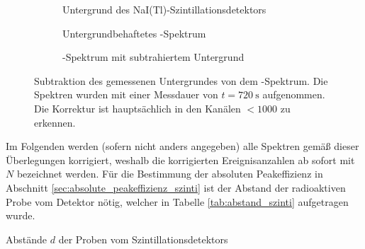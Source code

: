 \documentclass[11pt, a4paper]{article}
\numberwithin{equation}{section}
\begin{document}
\begin{figure}[hp]
	\centering
	\begin{subfigure}[b]{0.65\textwidth}
		\resizebox{!}{0.285\textheight}{
		
		}
		\caption{Untergrund des NaI(Tl)-Szintillationsdetektors}
		\label{fig:untergrund_szinti}
	\end{subfigure}
	
	\begin{subfigure}[b]{0.65\textwidth}
		\resizebox{!}{0.285\textheight}{
		
		}
		\caption{Untergrundbehaftetes -Spektrum}
		\label{fig:cobalt_mit_untergrund}
	\end{subfigure}
	
	\begin{subfigure}[b]{0.65\textwidth}
		\resizebox{!}{0.285\textheight}{
		
		}
		\caption{-Spektrum mit subtrahiertem Untergrund}
		\label{fig:cobalt_ohne_untergrund}
	\end{subfigure}
	\caption{Subtraktion des gemessenen Untergrundes von dem -Spektrum. Die Spektren wurden mit einer Messdauer von $t = \SI{720}{\second}$ aufgenommen. Die Korrektur ist hauptsächlich in den Kanälen $< 1000$ zu erkennen.}
	\label{fig:abzug_untergrund}
\end{figure}
Im Folgenden werden (sofern nicht anders angegeben) alle Spektren gemäß dieser Überlegungen korrigiert, weshalb die korrigierten Ereignisanzahlen ab sofort mit $N$ bezeichnet werden.
Für die Bestimmung der absoluten Peakeffizienz in Abschnitt \ref{sec:absolute_peakeffizienz_szinti} ist der Abstand der radioaktiven Probe vom Detektor nötig, welcher in Tabelle \ref{tab:abstand_szinti} aufgetragen wurde.
\begin{table}[h]
	\centering
	
	\caption{Abstände $d$ der Proben vom Szintillationsdetektors}
	\label{tab:abstand_szinti}
\end{table}
\end{document}

